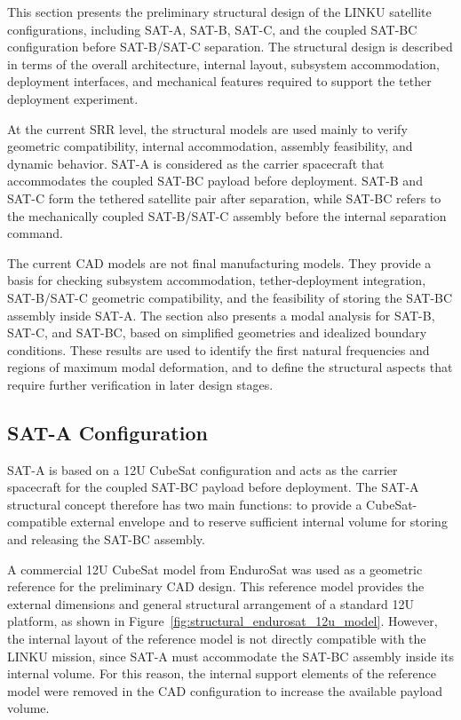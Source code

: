 This section presents the preliminary structural design of the LINKU satellite configurations, including SAT-A, SAT-B, SAT-C, and the coupled SAT-BC configuration before SAT-B/SAT-C separation. The structural design is described in terms of the overall architecture, internal layout, subsystem accommodation, deployment interfaces, and mechanical features required to support the tether deployment experiment.

At the current SRR level, the structural models are used mainly to verify geometric compatibility, internal accommodation, assembly feasibility, and dynamic behavior. SAT-A is considered as the carrier spacecraft that accommodates the coupled SAT-BC payload before deployment. SAT-B and SAT-C form the tethered satellite pair after separation, while SAT-BC refers to the mechanically coupled SAT-B/SAT-C assembly before the internal separation command.

The current CAD models are not final manufacturing models. They provide a basis for checking subsystem accommodation, tether-deployment integration, SAT-B/SAT-C geometric compatibility, and the feasibility of storing the SAT-BC assembly inside SAT-A. The section also presents a modal analysis for SAT-B, SAT-C, and SAT-BC, based on simplified geometries and idealized boundary conditions. These results are used to identify the first natural frequencies and regions of maximum modal deformation, and to define the structural aspects that require further verification in later design stages.

\subsection{SAT-A Configuration}
\label{sub:structural_sata}

SAT-A is based on a 12U CubeSat configuration and acts as the carrier spacecraft for the coupled SAT-BC payload before deployment. The SAT-A structural concept therefore has two main functions: to provide a CubeSat-compatible external envelope and to reserve sufficient internal volume for storing and releasing the SAT-BC assembly.

A commercial 12U CubeSat model from EnduroSat was used as a geometric reference for the preliminary CAD design. This reference model provides the external dimensions and general structural arrangement of a standard 12U platform, as shown in Figure~\ref{fig:structural_endurosat_12u_model}. However, the internal layout of the reference model is not directly compatible with the LINKU mission, since SAT-A must accommodate the SAT-BC assembly inside its internal volume. For this reason, the internal support elements of the reference model were removed in the CAD configuration to increase the available payload volume.

